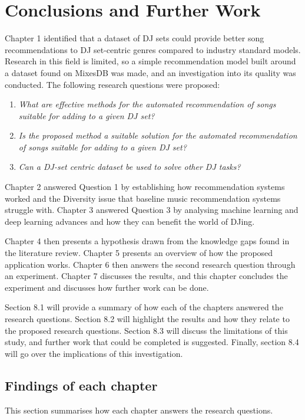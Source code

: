 
\graphicspath{{Chapter7/}}

\chapter{Conclusions and Further Work} 

Chapter 1 identified that a dataset of  DJ sets could provide better song recommendations to DJ set-centric genres compared to industry standard models. Research in this field is limited, so a simple recommendation model built around a dataset found on MixesDB was made, and an investigation into its quality was conducted. The following research questions were proposed:

\begin{enumerate}
	\item \textit{What are effective methods for the automated recommendation of songs suitable
		for adding to a given DJ set?}
	\item \textit{Is the proposed method a suitable solution for the automated recommendation of songs suitable for adding to a given DJ set?}
	\item \textit{Can a DJ-set centric dataset be used to solve other DJ tasks?}
\end{enumerate}

Chapter 2 answered Question 1 by establishing how recommendation systems worked and the Diversity issue that baseline music recommendation systems struggle with. Chapter 3 answered Question 3 by analysing machine learning and deep learning advances and how they can benefit the world of DJing. 

Chapter 4 then presents a hypothesis drawn from the knowledge gaps found in the literature review. Chapter 5 presents an overview of how the proposed application works. Chapter 6 then answers the second research question through an experiment. Chapter 7 discusses the results, and this chapter concludes the experiment and discusses how further work can be done.

Section 8.1 will provide a summary of how each of the chapters answered the research questions.
Section 8.2 will highlight the results and how they relate to the proposed research questions. Section 8.3 will discuss the limitations of this study, and further work that could be completed is suggested. Finally, section 8.4 will go over the implications of this investigation.

\section{Findings of each chapter}
This section summarises how each chapter answers the research questions.

